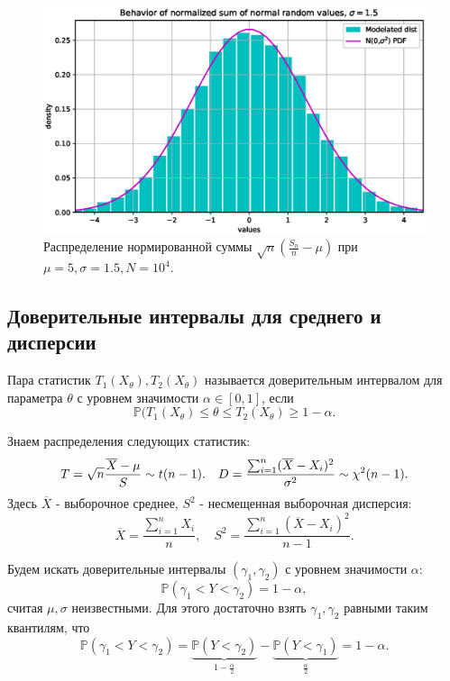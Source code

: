 \documentclass[11pt]{report}
\begin{document}
\begin{figure}[H]
    \centering
    \includegraphics[width=0.85\linewidth]{images/norm-sum-std.eps}
    \caption{Распределение нормированной суммы $\sqrt{n}(\frac{S_n}{n}-\mu)$ при $\mu=5,\sigma=1.5,N=10^4$.}
    \label{fig:norm-sum-std}
\end{figure}

\subsection{Доверительные интервалы для среднего и дисперсии}

\begin{definition}
Пара статистик $T_1(X_{\theta}),T_2(X_{\theta})$ называется доверительным интервалом для параметра $\theta$ с уровнем значимости $\alpha\in[0,1]$, если
$$
\mathbb{P}(T_1(X_{\theta})\leqslant\theta\leqslant T_2(X_{\theta}) \geqslant 1-\alpha.
$$
\end{definition}

Знаем распределения следующих статистик:
$$
T = \sqrt{n}\dfrac{\overline{X} - \mu}{S} \sim t(n-1). \\
\quad D = \dfrac{\sum_{i=1}^n(\overline{X} - X_i)^2}{\sigma^2} \sim \chi^2(n-1).
$$
Здесь $\overline{X}$ - выборочное среднее, $S^2$ - несмещенная выборочная дисперсия:
$$
\overline{X} = \dfrac{\sum_{i=1}^nX_i}{n},\quad S^2 = \dfrac{\sum_{i=1}^n(\overline{X}-X_i)^2}{n-1}.
$$

Будем искать доверительные интервалы $(\gamma_1,\gamma_2)$ с уровнем значимости $\alpha$:
$$
\mathbb{P}(\gamma_1 < Y < \gamma_2) = 1-\alpha,
$$
считая $\mu,\sigma$ неизвестными. Для этого достаточно взять $\gamma_1,\gamma_2$ равными таким квантилям, что
$$
\mathbb{P}(\gamma_1 < Y < \gamma_2) = \underbrace{\mathbb{P}(Y < \gamma_2)}_{1-\frac{\alpha}{2}} - \underbrace{\mathbb{P}(Y < \gamma_1)}_{\frac{\alpha}{2}} = 1 - \alpha.
$$
\end{document}
